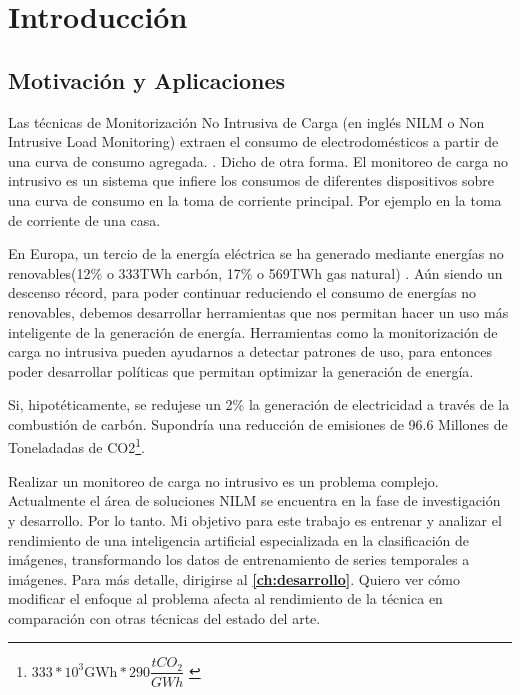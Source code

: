 
\chapter{Introducción}
\label{ch:intro}

\section{Motivación y Aplicaciones}
\label{sec:motivacionyaplicaciones}

Las técnicas de Monitorización No Intrusiva de Carga (en inglés NILM o Non Intrusive Load Monitoring) extraen el consumo de electrodomésticos a partir de una curva de consumo agregada. \autocite[1]{NILMreview2017}. Dicho de otra forma. El monitoreo de carga no intrusivo es un sistema que infiere los consumos de diferentes dispositivos sobre una curva de consumo en la toma de corriente principal. Por ejemplo en la toma de corriente de una casa.

En Europa, un tercio de la energía eléctrica se ha generado mediante energías no renovables(12\% o 333TWh carbón, 17\% o 569TWh gas natural)\autocite{energyeurope} \autocite{ember2024european}. Aún siendo un descenso récord, para poder continuar reduciendo el consumo de energías no renovables, debemos desarrollar herramientas que nos permitan hacer un uso más inteligente de la generación de energía. Herramientas como la monitorización de carga no intrusiva pueden ayudarnos a detectar patrones de uso\autocite[11]{nilmstateoftheart}, para entonces poder desarrollar políticas que permitan optimizar la generación de energía. 

Si, hipotéticamente, se redujese un 2\% la generación de electricidad a través de la combustión de carbón. Supondría una reducción de emisiones de 96.6 Millones de Toneladadas de CO2\footnote{$333*10^3\text{GWh}*290\dfrac{tCO_{2}}{GWh}$ \autocite{postcarbonelectricidad}}.

Realizar un monitoreo de carga no intrusivo es un problema complejo. Actualmente el área de soluciones NILM se encuentra en la fase de investigación y desarrollo. Por lo tanto. Mi objetivo para este trabajo es entrenar y analizar el rendimiento de una inteligencia artificial especializada en la clasificación de imágenes, transformando los datos de entrenamiento de series temporales a imágenes. Para más detalle, dirigirse al \textbf{\autoref{ch:desarrollo}}. Quiero ver cómo modificar el enfoque al problema afecta al rendimiento de la técnica en comparación con otras técnicas del estado del arte. 

